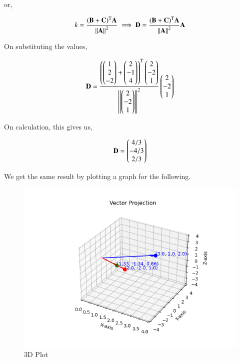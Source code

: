 \documentclass[journal]{IEEEtran}
\begin{document}
or,


\begin{align}
    k=\frac{(\textbf{B}+\textbf{C})^\text{T}\textbf{A}}{\left\lVert\textbf{A}\right\rVert^2} \implies \textbf{D} = \frac{(\textbf{B}+\textbf{C})^\text{T}\textbf{A}}{\left\lVert\textbf{A}\right\rVert^2}\textbf{A}
    \label{0.4}
\end{align}


On substituting the values,

\begin{align}
    \textbf{D} = \frac{\left(\begin{pmatrix}1\\2\\-2\end{pmatrix}+\begin{pmatrix}2\\-1\\4\end{pmatrix}\right)^\text{T}\begin{pmatrix}2\\-2\\1\end{pmatrix}}{\left\lVert\begin{pmatrix}2\\-2\\1\end{pmatrix}\right\rVert^2}\begin{pmatrix}2\\-2\\1\end{pmatrix}
    \label{0.5}
\end{align}

\newpage

On calculation, this gives us,

\begin{align}
    \textbf{D} = \begin{pmatrix}4/3\\-4/3\\2/3\end{pmatrix}
    \label{0.6}
\end{align}

We get the same result by plotting a graph for the following.
\begin{figure}[H]
    \centering
    \includegraphics[width=0.8\columnwidth]{figs/fig1.png}
    \caption{3D Plot}
    \label{3D Plot}
\end{figure}
\end{document}
